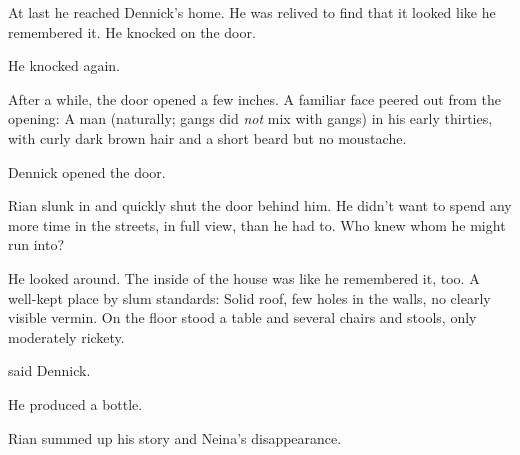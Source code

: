 At last he reached Dennick's home. 
He was relived to find that it looked like he remembered it. 
He knocked on the door. 

He knocked again. 

After a while, the door opened a few inches. 
A familiar face peered out from the opening: 
A \human{} man (naturally; \human{} gangs did \emph{not} mix with \scatha{} gangs) in his early thirties, with curly dark brown hair and a short beard but no moustache. 





Dennick opened the door. 

Rian slunk in and quickly shut the door behind him. 
He didn't want to spend any more time in the streets, in full view, than he had to. 
Who knew whom he might run into? 

He looked around. 
The inside of the house was like he remembered it, too. 
A well-kept place by slum standards: 
Solid roof, few holes in the walls, no clearly visible vermin. 
On the floor stood a table and several chairs and stools, only moderately rickety. 

 said Dennick. 


He produced a bottle. 



\begin{comment}
\subsection{The Black Plague}
\end{comment}

Rian summed up his story and Neina's disappearance. 

